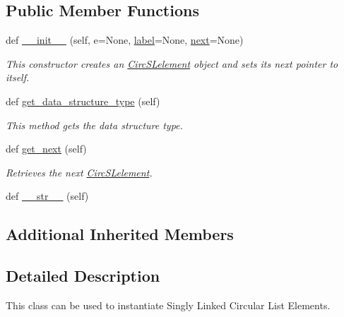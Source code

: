 \subsection*{Public Member Functions}
\begin{DoxyCompactItemize}
\item 
def \mbox{\hyperlink{class_bridges_1_1_circ_s_lelement_1_1_circ_s_lelement_ae7e31a351fb3d4009cd5bc58eb0cdff4}{\+\_\+\+\_\+init\+\_\+\+\_\+}} (self, e=None, \mbox{\hyperlink{class_bridges_1_1_element_1_1_element_a301fe5be8cf72b2c62f6a218feeb9166}{label}}=None, \mbox{\hyperlink{class_bridges_1_1_s_lelement_1_1_s_lelement_a650935f5a68b49de4c222cc4c8b0c778}{next}}=None)
\begin{DoxyCompactList}\small\item\em This constructor creates an \mbox{\hyperlink{class_bridges_1_1_circ_s_lelement_1_1_circ_s_lelement}{Circ\+S\+Lelement}} object and sets its next pointer to itself. \end{DoxyCompactList}\item 
def \mbox{\hyperlink{class_bridges_1_1_circ_s_lelement_1_1_circ_s_lelement_ac42fa1f929f264bb006cc36cd90f7341}{get\+\_\+data\+\_\+structure\+\_\+type}} (self)
\begin{DoxyCompactList}\small\item\em This method gets the data structure type. \end{DoxyCompactList}\item 
def \mbox{\hyperlink{class_bridges_1_1_circ_s_lelement_1_1_circ_s_lelement_a5d470152b0f73929a6add1606f8d8d9d}{get\+\_\+next}} (self)
\begin{DoxyCompactList}\small\item\em Retrieves the next \mbox{\hyperlink{class_bridges_1_1_circ_s_lelement_1_1_circ_s_lelement}{Circ\+S\+Lelement}}. \end{DoxyCompactList}\item 
def \mbox{\hyperlink{class_bridges_1_1_circ_s_lelement_1_1_circ_s_lelement_a1b5a00057f745704c4a9eb8babc7398a}{\+\_\+\+\_\+str\+\_\+\+\_\+}} (self)
\end{DoxyCompactItemize}
\subsection*{Additional Inherited Members}


\subsection{Detailed Description}
This class can be used to instantiate Singly Linked Circular List Elements. 

